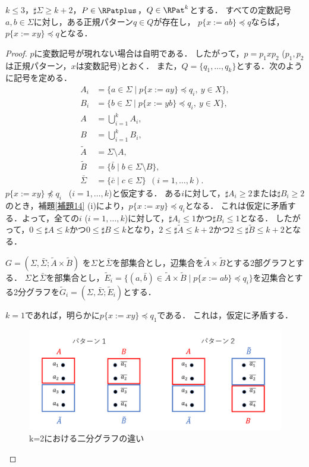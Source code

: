 \begin{lem}\label{kが3以下}
$k \le 3$，$\sharp \Sigma \ge k+2$，$P \in \RPatplus$，$Q \in \RPat^{k}$とする．
すべての定数記号$a, b \in \Sigma$に対し，ある正規パターン$q \in Q$が存在し，
$p \{ x:=ab \} \preceq q$ならば，$p \{ x:=xy \} \preceq q$となる．
\end{lem}
\begin{proof}
$p$に変数記号が現れない場合は自明である．
したがって，$p=p_{1}xp_{2}$ ($p_{1},p_{2}$は正規パターン，$x$は変数記号)とおく．
また，$Q=\{ q_{1}, \ldots , q_{k} \}$とする．次のように記号を定める．
\begin{align*}
A_{i} & = \{ a \in \Sigma \mid p \{ x:=ay \} \preceq q_{i},\ y\in X\},\\ 
B_{i} & = \{ b \in \Sigma \mid p \{ x:=yb \} \preceq q_{i},\ y\in X\},\\ 
A & = \bigcup_{i=1}^{k}A_{i},\\
B & = \bigcup_{i=1}^{k}B_{i},\\
\tilde{A} & = \Sigma\setminus A,\\
\tilde{B} & = \{ \bar{b} \mid b \in \Sigma \setminus B \},\\
\bar{\Sigma} & = \{ \bar{c} \mid c \in \Sigma \}~~(i=1, \ldots , k).
\end{align*}
$p \{ x:=xy \} \not \preceq q_{i}$ \ ($i=1, \ldots , k$)と仮定する．
ある$i$に対して，$\sharp A_{i} \ge 2$または$\sharp B_{i} \ge 2$のとき，補題\ref{補題14} (i)により，$p \{ x:=xy \} \preceq q_{i}$となる．
これは仮定に矛盾する．よって，全ての$i$ ($i=1, \ldots , k$)に対して，$\sharp A_{i} \le 1$かつ$\sharp B_{i} \le 1$となる．
したがって，$0 \le \sharp A \le k$かつ$0 \le \sharp B \le k$となり，$2 \le \sharp \tilde{A} \le k+2$かつ$2 \le \sharp \tilde{B} \le k+2$となる．

$G=(\Sigma,\bar{\Sigma}; \tilde{A} \times \tilde{B})$
を$\Sigma$と$\bar{\Sigma}$を部集合とし，辺集合を$\tilde{A} \times \tilde{B}$とする2部グラフとする．
$\Sigma$と$\bar{\Sigma}$を部集合とし，$\tilde{E}_{i}=\{ (a, \bar{b}) \in \tilde{A} \times \tilde{B} \mid p \{ x:=ab \} \preceq q_{i} \}$を辺集合とする2分グラフを$\tilde{G}_{i}=(\Sigma,\bar{\Sigma}; \tilde{E}_{i})$とする．

$k=1$であれば，明らかに$p \{ x:=xy \} \preceq q_{1}$である．
これは，仮定に矛盾する．

\begin{figure}[H]
\includegraphics[width=\linewidth]{画像/k=2におけるパターン.png}
\caption{\scriptsize k=2における二分グラフの違い}
\label{k=2におけるパターン}
\end{figure}


\end{proof}
